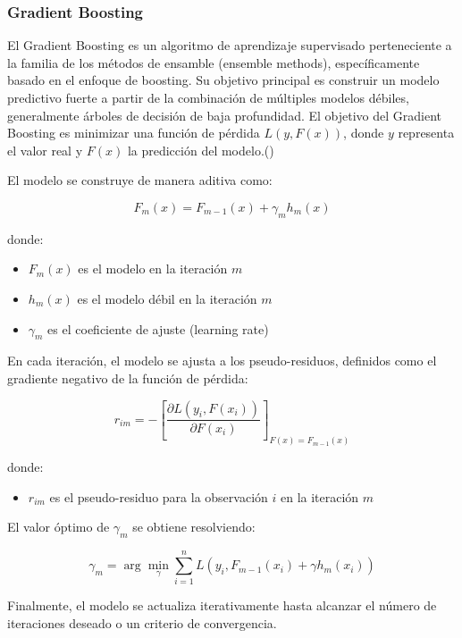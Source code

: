 \subsubsection{Gradient Boosting}
El Gradient Boosting es un algoritmo de aprendizaje supervisado perteneciente a la familia de los métodos de ensamble (ensemble methods), específicamente basado en el enfoque de boosting. Su objetivo principal es construir un modelo predictivo fuerte a partir de la combinación de múltiples modelos débiles, generalmente árboles de decisión de baja profundidad.
El objetivo del Gradient Boosting es minimizar una función de pérdida $L(y, F(x))$, donde $y$ representa el valor real y $F(x)$ la predicción del modelo.(\cite{friedman2001})

El modelo se construye de manera aditiva como:

\begin{equation}
	F_m(x) = F_{m-1}(x) + \gamma_m h_m(x)
\end{equation}

donde:
\begin{itemize}
	\item $F_m(x)$ es el modelo en la iteración $m$
	\item $h_m(x)$ es el modelo débil en la iteración $m$
	\item $\gamma_m$ es el coeficiente de ajuste (learning rate)
\end{itemize}

En cada iteración, el modelo se ajusta a los pseudo-residuos, definidos como el gradiente negativo de la función de pérdida:

\begin{equation}
	r_{im} = -\left[ \frac{\partial L(y_i, F(x_i))}{\partial F(x_i)} \right]_{F(x)=F_{m-1}(x)}
\end{equation}

donde:
\begin{itemize}
	\item $r_{im}$ es el pseudo-residuo para la observación $i$ en la iteración $m$
\end{itemize}

El valor óptimo de $\gamma_m$ se obtiene resolviendo:

\begin{equation}
	\gamma_m = \arg\min_{\gamma} \sum_{i=1}^{n} L\left(y_i, F_{m-1}(x_i) + \gamma h_m(x_i)\right)
\end{equation}

Finalmente, el modelo se actualiza iterativamente hasta alcanzar el número de iteraciones deseado o un criterio de convergencia.


